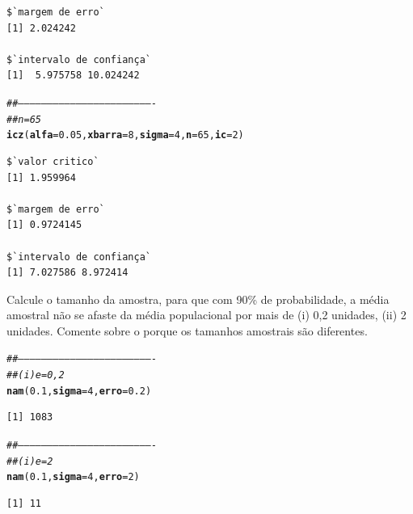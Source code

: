 \documentclass[a4paper,11pt,fleqn]{article}\usepackage[]{graphicx}\usepackage[]{color}
\makeatletter
\newcommand{\hlnum}[1]{\textcolor[rgb]{0,0,0}{#1}}%
\newcommand{\hlcom}[1]{\textcolor[rgb]{0.4,0.4,0.4}{\textit{#1}}}%
\newcommand{\hlstd}[1]{\textcolor[rgb]{0,0,0}{#1}}%
\newcommand{\hlkwc}[1]{\textcolor[rgb]{0,0,0}{\textbf{#1}}}%
\newcommand{\hlkwd}[1]{\textcolor[rgb]{0,0,0}{\textbf{#1}}}%
\newenvironment{kframe}{%
 \def\at@end@of@kframe{}%
 \ifinner\ifhmode%
  \def\at@end@of@kframe{\end{minipage}}%
  \begin{minipage}{\columnwidth}%
 \fi\fi%
 \def\FrameCommand##1{\hskip\@totalleftmargin \hskip-\fboxsep
 \colorbox{shadecolor}{##1}\hskip-\fboxsep
     \hskip-\linewidth \hskip-\@totalleftmargin \hskip\columnwidth}%
 \MakeFramed {\advance\hsize-\width
   \@totalleftmargin\z@ \linewidth\hsize
   \@setminipage}}%
 {\par\unskip\endMakeFramed%
 \at@end@of@kframe}
\newenvironment{knitrout}{}{} %
\theoremstyle{definition}
\makeatother
\begin{document}
\begin{compactenum}[6.]
\begin{compactenum}
\begin{knitrout}
\begin{kframe}
\begin{verbatim}
$`margem de erro`
[1] 2.024242

$`intervalo de confiança`
[1]  5.975758 10.024242
\end{verbatim}
\begin{alltt}
\hlcom{##----------------------------------------------------------------------}
\hlcom{## n = 65}
\hlkwd{icz}\hlstd{(}\hlkwc{alfa} \hlstd{=} \hlnum{0.05}\hlstd{,} \hlkwc{xbarra} \hlstd{=} \hlnum{8}\hlstd{,} \hlkwc{sigma} \hlstd{=} \hlnum{4}\hlstd{,} \hlkwc{n} \hlstd{=} \hlnum{65}\hlstd{,} \hlkwc{ic} \hlstd{=} \hlnum{2}\hlstd{)}
\end{alltt}
\begin{verbatim}
$`valor critico`
[1] 1.959964

$`margem de erro`
[1] 0.9724145

$`intervalo de confiança`
[1] 7.027586 8.972414
\end{verbatim}
\end{kframe}
\end{knitrout}
  \item Calcule o tamanho da amostra, para que com 90\% de
    probabilidade, a média amostral não se afaste da média populacional
    por mais de (i) 0,2 unidades, (ii) 2 unidades. Comente sobre o
    porque os tamanhos amostrais são diferentes.
\begin{knitrout}\small
{}\color{fgcolor}\begin{kframe}
\begin{alltt}
\hlcom{##----------------------------------------------------------------------}
\hlcom{## (i) e = 0,2}
\hlkwd{nam}\hlstd{(}\hlnum{0.1}\hlstd{,} \hlkwc{sigma} \hlstd{=} \hlnum{4}\hlstd{,} \hlkwc{erro} \hlstd{=} \hlnum{0.2}\hlstd{)}
\end{alltt}
\begin{verbatim}
[1] 1083
\end{verbatim}
\begin{alltt}
\hlcom{##----------------------------------------------------------------------}
\hlcom{## (i) e = 2}
\hlkwd{nam}\hlstd{(}\hlnum{0.1}\hlstd{,} \hlkwc{sigma} \hlstd{=} \hlnum{4}\hlstd{,} \hlkwc{erro} \hlstd{=} \hlnum{2}\hlstd{)}
\end{alltt}
\begin{verbatim}
[1] 11
\end{verbatim}
\end{kframe}
\end{knitrout}
  \end{compactenum}
\end{compactenum}
\end{document}
